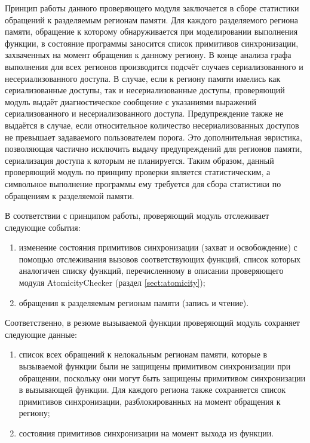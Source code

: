 Принцип работы данного проверяющего модуля заключается в сборе статистики обращений к разделяемым регионам памяти. Для каждого разделяемого региона памяти, обращение к которому обнаруживается при моделировании выполнения функции, в состояние программы заносится список примитивов синхронизации, захваченных на момент обращения к данному региону. В конце анализа графа выполнения для всех регионов производится подсчёт случаев сериализованного и несериализованного доступа. В случае, если к региону памяти имелись как сериализованные доступы, так и несериализованные доступы, проверяющий модуль выдаёт диагностическое сообщение с указаниями выражений сериализованного и несериализованного доступа. Предупреждение также не выдаётся в случае, если относительное количество несериализованных доступов не превышает задаваемого пользователем порога. Это дополнительная эвристика, позволяющая частично исключить выдачу предупреждений для регионов памяти, сериализация доступа к которым не планируется. Таким образом, данный проверяющий модуль по принципу проверки является статистическим, а символьное выполнение программы ему требуется для сбора статистики по обращениям к разделяемой памяти.

В соответствии с принципом работы, проверяющий модуль отслеживает следующие события:

\begin{enumerate}
 \item изменение состояния примитивов синхронизации (захват и освобождение) с помощью отслеживания вызовов соответствующих функций, список которых аналогичен списку функций, перечисленному в описании проверяющего модуля AtomicityChecker (раздел \ref{sect:atomicity});
 \item обращения к разделяемым регионам памяти (запись и чтение).
\end{enumerate}

Соответственно, в резюме вызываемой функции проверяющий модуль сохраняет следующие данные:

\begin{enumerate}
 \item список всех обращений к нелокальным регионам памяти, которые в вызываемой функции были не защищены примитивом синхронизации при обращении, поскольку они могут быть защищены примитивом синхронизации в вызывающей функции. Для каждого региона также сохраняется список примитивов синхронизации, разблокированных на момент обращения к региону;
 \item состояния примитивов синхронизации на момент выхода из функции.
\end{enumerate}

